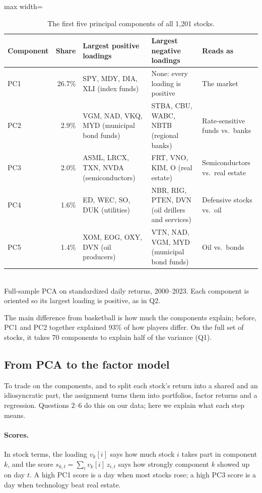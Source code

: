 \documentclass[11pt,letterpaper]{article}
\begin{document}
\begin{table}[!htbp]
\centering
\caption{The first five principal components of all 1,201 stocks.}
\label{tab:primer-full}
\small
\setlength{\tabcolsep}{4pt}
\begin{adjustbox}{max width=\linewidth}
\begin{tabular}{lr >{\raggedright\arraybackslash}p{3.6cm} >{\raggedright\arraybackslash}p{3.6cm} >{\raggedright\arraybackslash}p{3.2cm}}
\toprule
Component & Share & Largest positive loadings & Largest negative loadings & Reads as \\
\midrule
PC1 & 26.7\% & SPY, MDY, DIA, XLI (index funds) & None: every loading is positive & The market \\
\addlinespace
PC2 & 2.9\% & VGM, NAD, VKQ, MYD (municipal bond funds) & STBA, CBU, WABC, NBTB (regional banks) & Rate-sensitive funds vs.\ banks \\
\addlinespace
PC3 & 2.0\% & ASML, LRCX, TXN, NVDA (semiconductors) & FRT, VNO, KIM, O (real estate) & Semiconductors vs.\ real estate \\
\addlinespace
PC4 & 1.6\% & ED, WEC, SO, DUK (utilities) & NBR, RIG, PTEN, DVN (oil drillers and services) & Defensive stocks vs.\ oil \\
\addlinespace
PC5 & 1.4\% & XOM, EOG, OXY, DVN (oil producers) & VTN, NAD, VGM, MYD (municipal bond funds) & Oil vs.\ bonds \\
\bottomrule
\end{tabular}
\end{adjustbox}
\\[4pt]
\small Full-sample PCA on standardized daily returns, 2000--2023. Each
component is oriented so its largest loading is positive, as in Q2.
\end{table}
The main difference from basketball is how much the components explain; before, PC1 and PC2 together explained $93\%$ of how players differ. On the full set of stocks, it takes 70 components to explain half of the variance (Q1). 
\subsection{From PCA to the factor model}
To trade on the components, and to split each stock's return into a
shared and an idiosyncratic part, the assignment turns them into
portfolios, factor returns and a regression. Questions 2--6 do this on
our data; here we explain what each step means.

\paragraph{Scores.} In stock terms, the loading $v_k[i]$ says how much
stock $i$ takes part in component $k$, and the score
$s_{k,t}=\sum_i v_k[i]\,z_{i,t}$ says how strongly component $k$ showed up
on day $t$. A high PC1 score is a day when most stocks rose; a high PC3
score is a day when technology beat real estate.
\end{document}

